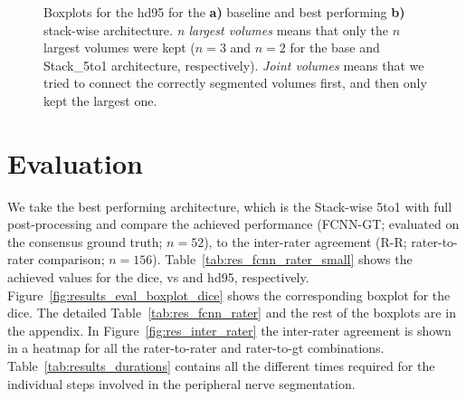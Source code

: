 \begin{figure}[htbp]
	\centering
	\hfill
	\caption[Boxplots for the \acrlong{hd95} for Post-processing]{Boxplots for the \acrlong{hd95} for the \textbf{a)} baseline and best performing \textbf{b)} stack-wise architecture. \textit{n largest volumes} means that only the $n$ largest volumes were kept ($n = 3$ and $n = 2$ for the base and Stack\_5to1 architecture, respectively). \textit{Joint volumes} means that we tried to connect the correctly segmented volumes first, and then only kept the largest one.}
	\label{fig:pp_boxplots_hd95}  
\end{figure}

\section{Evaluation} \label{sec:exp_evaluation} %
We take the best performing architecture, which is the Stack-wise 5to1 with full post-processing and compare the achieved performance (FCNN-GT; evaluated on the consensus ground truth; $n = 52$), to the inter-rater agreement (R-R; rater-to-rater comparison; $n = 156$).
Table~\ref{tab:res_fcnn_rater_small} shows the achieved values for the \acrlong{dice}, \acrlong{vs} and \acrlong{hd95}, respectively. 
Figure~\ref{fig:results_eval_boxplot_dice} shows the corresponding boxplot for the \acrlong{dice}. The detailed Table~\ref{tab:res_fcnn_rater} and the rest of the boxplots are in the appendix.
In Figure~\ref{fig:res_inter_rater} the inter-rater agreement is shown in a heatmap for all the rater-to-rater and rater-to-gt combinations. Table~\ref{tab:results_durations} contains all the different times required for the individual steps involved in the peripheral nerve segmentation.

